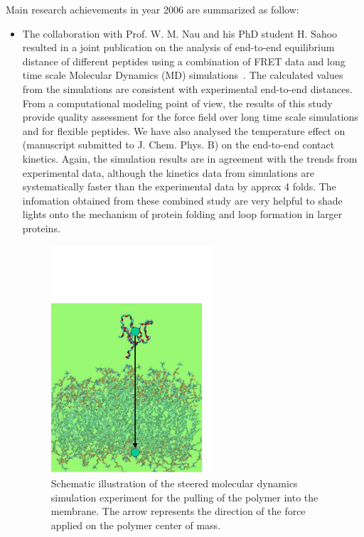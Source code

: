 Main research achievements in year 2006 are summarized as follow:

\begin{itemize}
\item{} The collaboration with Prof. W. M. Nau and his PhD student H. Sahoo resulted in a joint publication on the   
analysis of end-to-end equilibrium distance of different peptides using a combination of FRET data and long time scale Molecular Dynamics (MD) simulations~\cite{Sahoo06}. The calculated values from the simulations are 
consistent with experimental end-to-end distances. From a 
computational modeling point of view, the results of this study provide quality assessment for the force field over 
long time scale simulations and for flexible peptides.  
We have also analysed the temperature effect on (manuscript submitted to J. Chem. Phys. B) on
 the end-to-end contact kinetics. Again, the simulation results are in agreement with the trends from 
experimental data, although the kinetics data from simulations are systematically 
faster than the experimental data by approx 4 folds. The infomation obtained from these combined
study are very helpful to shade lights onto the mechanism of protein folding and loop formation
in larger proteins. 

\begin{figure}[ht]
  \begin{center}
    \includegraphics[width=6cm]{DrRoccatano-fig3}
    \caption{Schematic illustration of the steered molecular dynamics simulation experiment 
    for the pulling of the polymer into the membrane. The arrow represents the direction
    of the force applied on the polymer center of mass.}
    \label{fig:Roccatano3}
   \end{center}
\end{figure}



\end{itemize}
